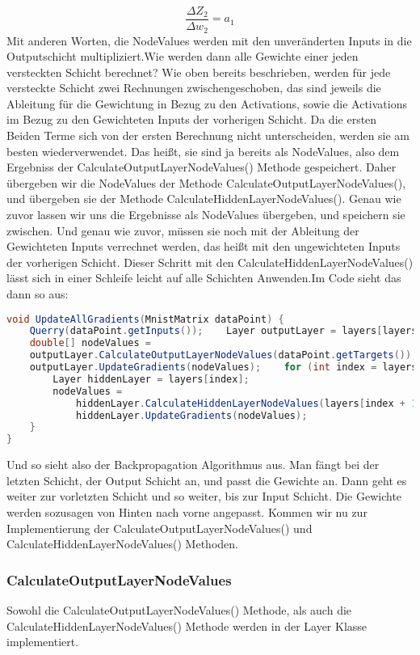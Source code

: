 \documentclass[12pt]{article}
\begin{document}
$$\frac{\Delta Z_2}{\Delta w_2}=a_1$$
Mit anderen Worten, die NodeValues werden mit den unveränderten Inputs in die Outputschicht multipliziert.Wie werden dann alle Gewichte einer jeden versteckten Schicht berechnet? 
Wie oben bereits beschrieben, werden für jede versteckte Schicht zwei Rechnungen zwischengeschoben, das sind jeweils die Ableitung für die Gewichtung in Bezug zu den Activations, sowie die Activations im Bezug zu den Gewichteten Inputs der vorherigen Schicht. Da die ersten Beiden Terme sich von der ersten Berechnung nicht unterscheiden, werden sie am besten wiederverwendet. Das heißt, sie sind ja bereits als NodeValues, also dem Ergebniss der CalculateOutputLayerNodeValues() Methode gespeichert. Daher übergeben wir die NodeValues der Methode CalculateOutputLayerNodeValues(), und übergeben sie der Methode CalculateHiddenLayerNodeValues(). Genau wie zuvor lassen wir uns die Ergebnisse als NodeValues übergeben, und speichern sie zwischen. Und genau wie zuvor, müssen sie noch mit der Ableitung der Gewichteten Inputs verrechnet werden, das heißt mit den ungewichteten Inputs der vorherigen Schicht.
Dieser Schritt mit den CalculateHiddenLayerNodeValues() lässt sich in einer Schleife leicht auf alle Schichten Anwenden.Im Code sieht das dann so aus:\begin{lstlisting}[language=Java]
void UpdateAllGradients(MnistMatrix dataPoint) {
    Querry(dataPoint.getInputs());    Layer outputLayer = layers[layers.length - 1];
    double[] nodeValues = 
    outputLayer.CalculateOutputLayerNodeValues(dataPoint.getTargets());
    outputLayer.UpdateGradients(nodeValues);    for (int index = layers.length - 2; index >= 0; index--) {
        Layer hiddenLayer = layers[index];
        nodeValues = 
            hiddenLayer.CalculateHiddenLayerNodeValues(layers[index + 1], nodeValues);
            hiddenLayer.UpdateGradients(nodeValues);
    }
}
\end{lstlisting}Und so sieht also der Backpropagation Algorithmus aus. Man fängt bei der letzten Schicht, der Output Schicht an, und passt die Gewichte an. Dann geht es weiter zur vorletzten Schicht und so weiter, bis zur Input Schicht. Die Gewichte werden sozusagen von Hinten nach vorne angepasst.
Kommen wir nu zur Implementierung der CalculateOutputLayerNodeValues() und CalculateHiddenLayerNodeValues() Methoden.\subsubsection{ CalculateOutputLayerNodeValues}Sowohl die CalculateOutputLayerNodeValues() Methode, als auch die CalculateHiddenLayerNodeValues() Methode werden in der Layer Klasse implementiert.
\end{document}

